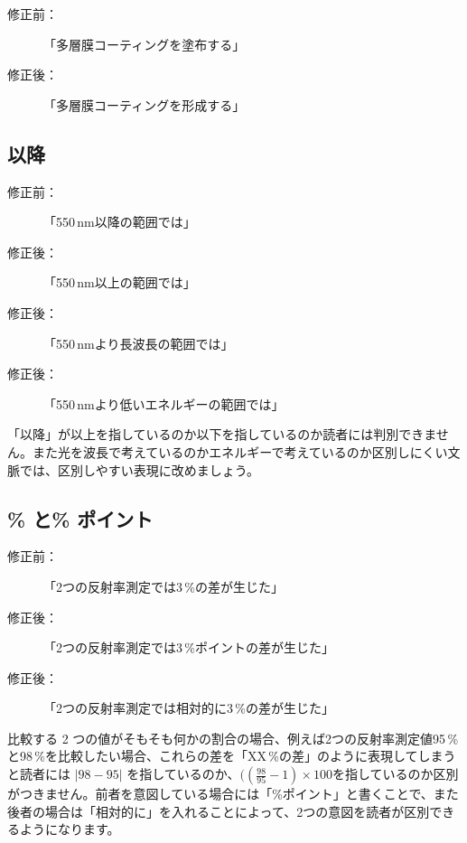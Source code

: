\begin{description}
\item[修正前：]「多層膜コーティングを塗布する」
\item[修正後：]「多層膜コーティングを形成する」
\end{description}


\subsection{以降}

\begin{description}
\item[修正前：]「550\,nm以降の範囲では」
\item[修正後：]「550\,nm以上の範囲では」
\item[修正後：]「550\,nmより長波長の範囲では」
\item[修正後：]「550\,nmより低いエネルギーの範囲では」
\end{description}

「以降」が以上を指しているのか以下を指しているのか読者には判別できません。また光を波長で考えているのかエネルギーで考えているのか区別しにくい文脈では、区別しやすい表現に改めましょう。

\subsection{\% と\% ポイント}

\begin{description}
\item[修正前：]「2つの反射率測定では3\,\%の差が生じた」
\item[修正後：]「2つの反射率測定では3\,\%ポイントの差が生じた」
\item[修正後：]「2つの反射率測定では相対的に3\,\%の差が生じた」
\end{description}

比較する 2 つの値がそもそも何かの割合の場合、例えば2つの反射率測定値95\,\%と98\,\%を比較したい場合、これらの差を「XX\,\%の差」のように表現してしまうと読者には $|98-95|$ を指しているのか、$((\frac{98}{95} - 1)\times100$を指しているのか区別がつきません。前者を意図している場合には「\%ポイント」と書くことで、また後者の場合は「相対的に」を入れることによって、2つの意図を読者が区別できるようになります。

